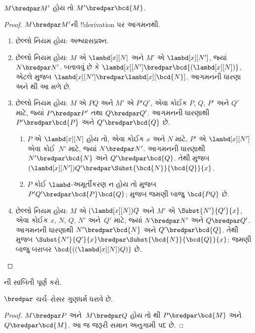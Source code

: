 \documentclass[../../../include/open-logic-section]{subfiles}
\begin{document}
\begin{lem}
  $M \bredpar M'$ હોય તો $M' \bredpar \bcd{M}$.
\end{lem}
\begin{proof}
  $M \bredpar M'$ની !!{derivation} પર આગમનથી.
  \begin{enumerate}
    \item છેલ્લો નિયમ  હોય: અભ્યાસપ્રશ્ન.
    \item છેલ્લો નિયમ  હોય:
      $M$ એ $\lambd[x][N]$ અને $M'$ એ $\lambd[x][N']$,
      જ્યાં $N \bredpar N'$. બતાવવું છે કે
      $\lambd[x][N'] \bredpar
      \bcd{(\lambd[x][N])}$, એટલે
       મુજબ
      $\lambd[x][N'] \bredpar \lambd[x][\bcd{N}]$.
      આગમનની ધારણા અને થી આ મળે છે.
    \item છેલ્લો નિયમ  હોય:
      $M$ એ $PQ$ અને $M'$ એ $P'Q'$,
      એવા કોઈક $P$, $Q$, $P'$ અને $Q'$ માટે, જ્યાં
      $P \bredpar P'$ તથા $Q \bredpar Q'$.
      આગમનની ધારણાથી $P' \bredpar \bcd{P}$
      અને $Q' \bredpar \bcd{Q}$ છે.
      \begin{enumerate}
        \item $P$ એ $\lambd[x][N]$ હોય તો,
          એવા કોઈક $x$ અને $N$ માટે,
          $P'$ એ $\lambd[x][N']$ એવા કોઈ~$N'$ માટે,
          જ્યાં $N \bredpar N'$. આગમનની ધારણાથી
          $N' \bredpar \bcd{N}$ અને
          $Q' \bredpar \bcd{Q}$. તેથી
           મુજબ
          $(\lambd[x][N'])Q' \bredpar
          \Subst{\bcd{N}}{\bcd{Q}}{x}$.
        \item $P$ કોઈ $\lambd$-અમૂર્તીકરણ ન હોય તો
           મુજબ
          $P'Q' \bredpar \bcd{P}\bcd{Q}$;
           મુજબ જમણી બાજુ
          $\bcd{PQ}$ છે.
      \end{enumerate}
    \item છેલ્લો નિયમ  હોય:
      $M$ એ $(\lambd[x][N])Q$ અને
      $M'$ એ $\Subst{N'}{Q'}{x}$,
      એવા કોઈક $x$, $N$, $Q$, $N'$ અને~$Q'$ માટે, જ્યાં
      $N \bredpar N'$ અને $Q \bredpar Q'$.
      આગમનની ધારણાથી $N' \bredpar \bcd{N}$
      અને $Q' \bredpar \bcd{Q}$. તેથી
       મુજબ
      $\Subst{N'}{Q'}{x} \bredpar
      \Subst{\bcd{N}}{\bcd{Q}}{x}$;
      જમણી બાજુ બરાબર
      $\bcd{((\lambd[x][N])Q)}$ છે.
  \end{enumerate}
\end{proof}

\begin{prob}
  ની સાબિતી પૂર્ણ કરો.
\end{prob}

\begin{thm}
  $\bredpar$ ચર્ચ--રોસર ગુણધર્મ ધરાવે છે.
\end{thm}

\begin{proof}
  $M\bredpar P$ અને~$M\bredpar Q$ હોય તો
  થી $P\bredpar\bcd{M}$ અને
  $Q\bredpar\bcd{M}$. આ જ જરૂરી સમાન અનુગામી પદ છે.
\end{proof}
\end{document}
